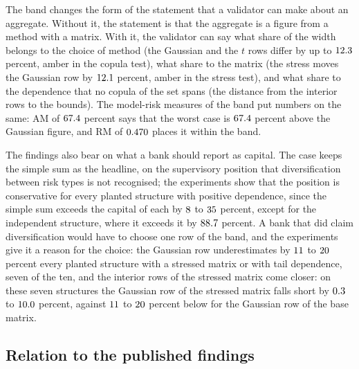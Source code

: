 The band changes the form of the statement that a validator can make about an aggregate. Without it, the statement is that the
aggregate is a figure from a method with a matrix. With it, the validator can say what share of the width belongs to the choice of
method (the Gaussian and the $t$ rows differ by up to $12.3$ percent, amber in the copula test), what share to
the matrix (the stress moves the Gaussian row by $12.1$ percent, amber in the stress test), and what share to the
dependence that no copula of the set spans (the distance from the interior rows to the bounds). The model-risk measures of the band
put numbers on the same: $\mathrm{AM}$ of $67.4$ percent says that the worst case is $67.4$ percent above the Gaussian figure,
and $\mathrm{RM}$ of $0.470$ places it within the band.

The findings also bear on what a bank should report as capital. The case keeps the simple sum as the headline, on the supervisory
position that diversification between risk types is not recognised; the experiments show that the position is conservative for
every planted structure with positive dependence, since the simple sum exceeds the capital of each by $8$ to $35$ percent, except for
the independent structure, where it exceeds it by $88.7$ percent. A bank that did claim diversification would have to
choose one row of the band, and the experiments give it a reason for the choice: the Gaussian row underestimates by $11$ to $20$ percent
every planted structure with a stressed matrix or with tail dependence, seven of the ten, and the interior rows of the stressed matrix come closer: on these seven structures the Gaussian row of the stressed matrix falls short by
$0.3$ to $10.0$ percent, against $11$ to $20$ percent below for the Gaussian row of the base matrix.

\subsection{Relation to the published findings}
\label{sec:discussion-literature}

